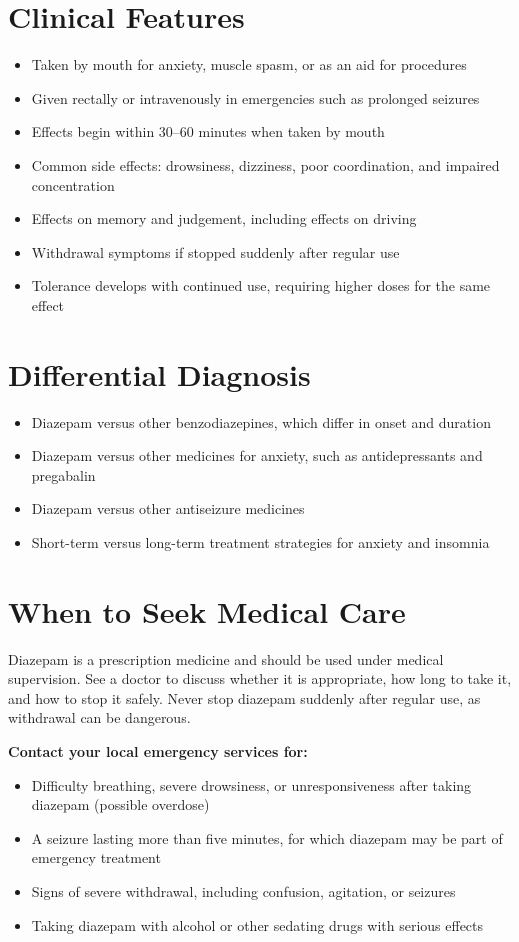 \section*{Clinical Features}
\begin{itemize}
    \item Taken by mouth for anxiety, muscle spasm, or as an aid for procedures
    \item Given rectally or intravenously in emergencies such as prolonged seizures
    \item Effects begin within 30--60 minutes when taken by mouth
    \item Common side effects: drowsiness, dizziness, poor coordination, and impaired concentration
    \item Effects on memory and judgement, including effects on driving
    \item Withdrawal symptoms if stopped suddenly after regular use
    \item Tolerance develops with continued use, requiring higher doses for the same effect
\end{itemize}

\section*{Differential Diagnosis}
\begin{itemize}
    \item Diazepam versus other benzodiazepines, which differ in onset and duration
    \item Diazepam versus other medicines for anxiety, such as antidepressants and pregabalin
    \item Diazepam versus other antiseizure medicines
    \item Short-term versus long-term treatment strategies for anxiety and insomnia
\end{itemize}

\section*{When to Seek Medical Care}
Diazepam is a prescription medicine and should be used under medical supervision. See a doctor to discuss whether it is appropriate, how long to take it, and how to stop it safely. Never stop diazepam suddenly after regular use, as withdrawal can be dangerous.

\textbf{Contact your local emergency services for:}
\begin{itemize}
    \item Difficulty breathing, severe drowsiness, or unresponsiveness after taking diazepam (possible overdose)
    \item A seizure lasting more than five minutes, for which diazepam may be part of emergency treatment
    \item Signs of severe withdrawal, including confusion, agitation, or seizures
    \item Taking diazepam with alcohol or other sedating drugs with serious effects
\end{itemize}

